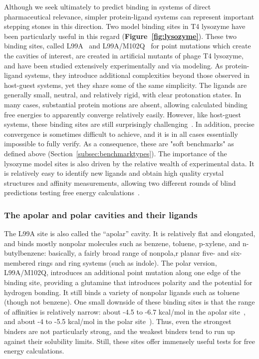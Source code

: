 \documentclass[aps,pre,twocolumn,nofootinbib,superscriptaddress,10pt, final,tightenlines]{revtex4-1}
\begin{document}
Although we seek ultimately to predict binding in systems of direct pharmaceutical relevance, simpler protein-ligand systems can represent important stepping stones in this direction.
Two model binding sites in T4 lysozyme have been particularly useful in this regard ({\bf Figure~\ref{fig:lysozyme}}). 
These two binding sites, called L99A~\cite{morton_energetic_1995, morton_specificity_1995} and L99A/M102Q~\cite{wei_model_2002, graves_decoys_2005} for point mutations which create the cavities of interest, are created in artificial mutants of phage T4 lysozyme, and have been studied extensively experimentally and via modeling. 
As protein-ligand systems, they introduce additional complexities beyond those observed in host-guest systems, yet they share some of the same simplicity.
The ligands are generally small, neutral, and relatively rigid, with clear protonation states.
In many cases, substantial protein motions are absent, allowing calculated binding free energies to apparently converge relatively easily. 
However, like host-guest systems, these binding sites are still surprisingly challenging~\cite{mobley_use_2006, mobley_confine_2007, mobley_predicting_2007, boyce_predicting_2009, jiang_free_2010, gallicchio_binding_2010, lim_sensitivity_2016}. In addition, precise convergence is sometimes difficult to achieve, and it is in all cases essentially impossible to fully verify.  As a consequence, these are "soft benchmarks" as defined above (Section~\ref{subsec:benchmarktypes}).
The importance of the lysozyme model sites is also driven by the relative wealth of experimental data. 
It is relatively easy to identify new ligands and obtain high quality crystal structures and affinity measurements, allowing two different rounds of blind predictions testing free energy calculations~\cite{mobley_predicting_2007, boyce_predicting_2009}. 


\subsubsection{The apolar and polar cavities and their ligands}
The L99A site is also called the ``apolar'' cavity. It is relatively flat and elongated, and binds mostly nonpolar molecules such as benzene, toluene, p-xylene, and n-butylbenzene: basically, a fairly broad range of nonpola,r planar five- and six-membered rings and ring systems (such as indole).
The polar version, L99A/M102Q, introduces an additional point mutation along one edge of the binding site, providing a glutamine that introduces polarity and the potential for hydrogen bonding. 
It still binds a variety of nonpolar ligands such as toluene (though not benzene). 
One small downside of these binding sites is that the range of affinities is relatively narrow: about -4.5 to -6.7 kcal/mol in the apolar site~\cite{morton_energetic_1995, mobley_predicting_2007}, and about -4 to -5.5 kcal/mol in the polar site~\cite{boyce_predicting_2009}). Thus, even the strongest binders are not particularly strong, and the weakest binders tend to run up against their solubility limits. 
Still, these sites offer immensely useful tests for free energy calculations.
\end{document}
